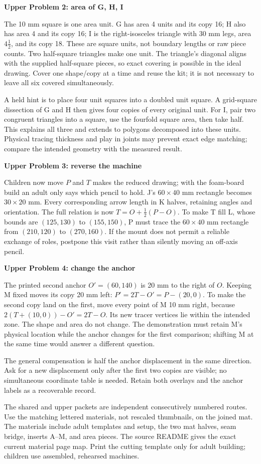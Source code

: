 \documentclass[11pt,letterpaper]{article}
\newcommand{\heading}[1]{\par\vspace{4pt}{\large\bfseries #1}\par}
\newcommand{\sub}[1]{\par\textbf{#1}\par}
\begin{document}
\sub{Upper Problem 2: area of G, H, I}
The 10 mm square is one area unit. G has area 4 units and its copy 16; H also has area 4 and its copy 16; I is the right-isosceles triangle with 30 mm legs, area $4\frac12$, and its copy 18. These are square units, not boundary lengths or raw piece counts. Two half-square triangles make one unit. The triangle's diagonal aligns with the supplied half-square pieces, so exact covering is possible in the ideal drawing. Cover one shape/copy at a time and reuse the kit; it is not necessary to leave all six covered simultaneously.

A held hint is to place four unit squares into a doubled unit square. A grid-square dissection of G and H then gives four copies of every original unit. For I, pair two congruent triangles into a square, use the fourfold square area, then take half. This explains all three and extends to polygons decomposed into these units. Physical tracing thickness and play in joints may prevent exact edge matching; compare the intended geometry with the measured result.

\sub{Upper Problem 3: reverse the machine}
Children now move $P$ and $T$ makes the reduced drawing; with the foam-board build an adult only says which pencil to hold. J's $60\times40$ mm rectangle becomes $30\times20$ mm. Every corresponding arrow length in K halves, retaining angles and orientation. The full relation is now $T=O+\frac12(P-O)$. To make T fill L, whose bounds are $(125,130)$ to $(155,150)$, P must trace the $60\times40$ mm rectangle from $(210,120)$ to $(270,160)$. If the mount does not permit a reliable exchange of roles, postpone this visit rather than silently moving an off-axis pencil.

\sub{Upper Problem 4: change the anchor}
The printed second anchor $O'=(60,140)$ is 20 mm to the right of $O$. Keeping M fixed moves its copy 20 mm left: $P'=2T-O'=P-(20,0)$. To make the second copy land on the first, move every point of M 10 mm right, because $2(T+(10,0))-O'=2T-O$. Its new tracer vertices lie within the intended zone. The shape and area do not change. The demonstration must retain M's physical location while the anchor changes for the first comparison; shifting M at the same time would answer a different question.

The general compensation is half the anchor displacement in the same direction. Ask for a new displacement only after the first two copies are visible; no simultaneous coordinate table is needed. Retain both overlays and the anchor labels as a recoverable record.
\newpage
\heading{Print selection, provenance and use record}
The shared and upper packets are independent consecutively numbered routes. Use the matching lettered materials, not rescaled thumbnails, on the joined mat. The materials include adult templates and setup, the two mat halves, seam bridge, inserts A--M, and area pieces. The source README gives the exact current material page map. Print the cutting template only for adult building; children use assembled, rehearsed machines.
\end{document}
